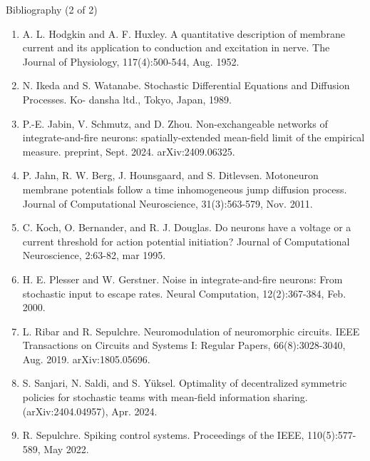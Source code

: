 \documentclass[8pt]{beamer}
\newcommand{\1}[1]{\mathbbm{1}_{\{#1\}}}
\begin{document}
\begin{frame}{Bibliography (2 of 2)}
    \begin{enumerate}[1.]
        \item A. L. Hodgkin and A. F. Huxley. A quantitative description of membrane current and its
        application to conduction and excitation in nerve. The Journal of Physiology, 117(4):500-544,
        Aug. 1952.
        \item N. Ikeda and S. Watanabe. Stochastic Differential Equations and Diffusion Processes. Ko-
        dansha ltd., Tokyo, Japan, 1989.
        \item P.-E. Jabin, V. Schmutz, and D. Zhou. Non-exchangeable networks of integrate-and-fire
        neurons: spatially-extended mean-field limit of the empirical measure. preprint, Sept. 2024.
        arXiv:2409.06325.
        \item P. Jahn, R. W. Berg, J. Hounsgaard, and S. Ditlevsen. Motoneuron membrane potentials
        follow a time inhomogeneous jump diffusion process. Journal of Computational Neuroscience,
        31(3):563-579, Nov. 2011.
        \item C. Koch, O. Bernander, and R. J. Douglas. Do neurons have a voltage or a current threshold
        for action potential initiation? Journal of Computational Neuroscience, 2:63-82, mar 1995.
        \item H. E. Plesser and W. Gerstner. Noise in integrate-and-fire neurons: From stochastic input to
        escape rates. Neural Computation, 12(2):367-384, Feb. 2000.
        \item L. Ribar and R. Sepulchre. Neuromodulation of neuromorphic circuits. IEEE Transactions
        on Circuits and Systems I: Regular Papers, 66(8):3028-3040, Aug. 2019. arXiv:1805.05696.
        \item S. Sanjari, N. Saldi, and S. Y\"uksel. Optimality of decentralized symmetric policies for
        stochastic teams with mean-field information sharing. (arXiv:2404.04957), Apr. 2024.
        \item R. Sepulchre. Spiking control systems. Proceedings of the IEEE, 110(5):577-589, May 2022.
    \end{enumerate}
\end{frame}
\end{document}
